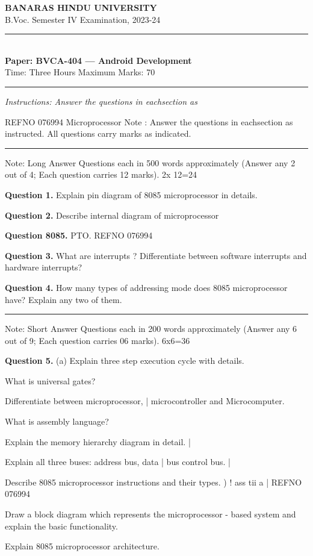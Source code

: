 \documentclass[11pt,a4paper]{article}
\begin{document}
\begin{center}
  {\large\bfseries BANARAS HINDU UNIVERSITY}\\[2pt]
  {\normalsize B.Voc. Semester IV Examination, 2023-24}\\[6pt]
  \rule{0.8\linewidth}{0.5pt}\\[6pt]
  {\large\bfseries Paper: BVCA-404 --- Android Development}\\[4pt]
  {\normalsize Time: Three Hours \hfill Maximum Marks: 70}
\end{center}

\rule{\linewidth}{0.4pt}

\smallskip
\noindent\textit{Instructions: Answer the questions in eachsection as}

\bigskip

REFNO 076994
Microprocessor
Note : Answer the questions in eachsection as
instructed.
All questions carry marks as indicated.

\bigskip{}
\rule{\linewidth}{0.4pt}\smallskip

Note: Long Answer Questions each in 500 words
approximately (Answer any 2 out of 4; Each
question carries 12 marks). 2x 12=24

\medskip\noindent\textbf{Question 1.} Explain pin diagram of 8085 microprocessor in
details.

\medskip\noindent\textbf{Question 2.} Describe internal diagram of microprocessor

\medskip\noindent\textbf{Question 8085.}
PTO.
REFNO 076994

\medskip\noindent\textbf{Question 3.} What are interrupts ? Differentiate between
software interrupts and hardware interrupts?

\medskip\noindent\textbf{Question 4.} How many types of addressing mode does 8085
microprocessor have? Explain any two of them.

\bigskip{}
\rule{\linewidth}{0.4pt}\smallskip

Note: Short Answer Questions each in 200 words
approximately (Answer any 6 out of 9; Each
question carries 06 marks). 6x6=36

\medskip\noindent\textbf{Question 5.} (a) Explain three step execution cycle with
details.
\begin{parts}
  \item What is universal gates?
  \item Differentiate between microprocessor, |
  microcontroller and Microcomputer.
  \item What is assembly language?
  \item Explain the memory hierarchy diagram in
  detail. |
  \item Explain all three buses: address bus, data |
  bus control bus. |
  \item Describe 8085 microprocessor instructions
  and their types. )
  !
  ass tii a
  | REFNO 076994
  \item Draw a block diagram which represents
  the microprocessor - based system and
  explain the basic functionality.
  \item Explain 8085 microprocessor architecture.
\end{parts}
\end{document}
